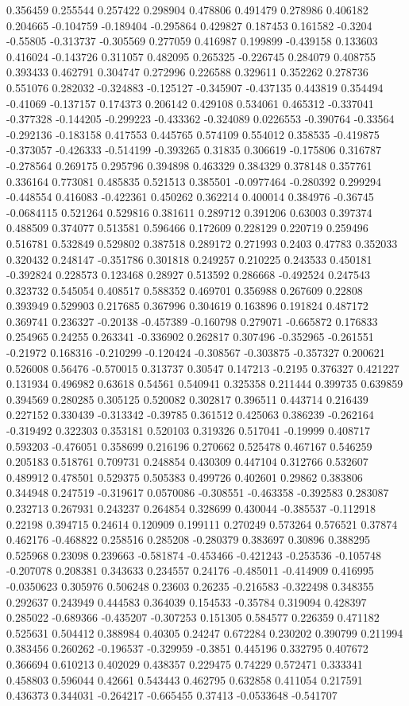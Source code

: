 0.356459 0.255544 0.257422 0.298904 0.478806 0.491479 0.278986 0.406182 0.204665 -0.104759 -0.189404 -0.295864 0.429827 0.187453 0.161582 -0.3204 -0.55805 -0.313737 -0.305569 0.277059 0.416987 0.199899 -0.439158 0.133603 0.416024 -0.143726 0.311057 0.482095 0.265325 -0.226745 0.284079 0.408755 0.393433 0.462791 0.304747 0.272996 0.226588 0.329611 0.352262 0.278736 0.551076 0.282032 -0.324883 -0.125127 -0.345907 -0.437135 0.443819 0.354494 -0.41069 -0.137157 0.174373 0.206142 0.429108 0.534061 0.465312 -0.337041 -0.377328 -0.144205 -0.299223 -0.433362 -0.324089 0.0226553 -0.390764 -0.33564 -0.292136 -0.183158 0.417553 0.445765 0.574109 0.554012 0.358535 -0.419875 -0.373057 -0.426333 -0.514199 -0.393265 0.31835 0.306619 -0.175806 0.316787 -0.278564 0.269175 0.295796 0.394898 0.463329 0.384329 0.378148 0.357761 0.336164 0.773081 0.485835 0.521513 0.385501 -0.0977464 -0.280392 0.299294 -0.448554 0.416083 -0.422361 0.450262 0.362214 0.400014 0.384976 -0.36745 -0.0684115 0.521264 0.529816 0.381611 0.289712 0.391206 0.63003 0.397374 0.488509 0.374077 0.513581 0.596466 0.172609 0.228129 0.220719 0.259496 0.516781 0.532849 0.529802 0.387518 0.289172 0.271993 0.2403 0.47783 0.352033 0.320432 0.248147 -0.351786 0.301818 0.249257 0.210225 0.243533 0.450181 -0.392824 0.228573 0.123468 0.28927 0.513592 0.286668 -0.492524 0.247543 0.323732 0.545054 0.408517 0.588352 0.469701 0.356988 0.267609 0.22808 0.393949 0.529903 0.217685 0.367996 0.304619 0.163896 0.191824 0.487172 0.369741 0.236327 -0.20138 -0.457389 -0.160798 0.279071 -0.665872 0.176833 0.254965 0.24255 0.263341 -0.336902 0.262817 0.307496 -0.352965 -0.261551 -0.21972 0.168316 -0.210299 -0.120424 -0.308567 -0.303875 -0.357327 0.200621 0.526008 0.56476 -0.570015 0.313737 0.30547 0.147213 -0.2195 0.376327 0.421227 0.131934 0.496982 0.63618 0.54561 0.540941 0.325358 0.211444 0.399735 0.639859 0.394569 0.280285 0.305125 0.520082 0.302817 0.396511 0.443714 0.216439 0.227152 0.330439 -0.313342 -0.39785 0.361512 0.425063 0.386239 -0.262164 -0.319492 0.322303 0.353181 0.520103 0.319326 0.517041 -0.19999 0.408717 0.593203 -0.476051 0.358699 0.216196 0.270662 0.525478 0.467167 0.546259 0.205183 0.518761 0.709731 0.248854 0.430309 0.447104 0.312766 0.532607 0.489912 0.478501 0.529375 0.505383 0.499726 0.402601 0.29862 0.383806 0.344948 0.247519 -0.319617 0.0570086 -0.308551 -0.463358 -0.392583 0.283087 0.232713 0.267931 0.243237 0.264854 0.328699 0.430044 -0.385537 -0.112918 0.22198 0.394715 0.24614 0.120909 0.199111 0.270249 0.573264 0.576521 0.37874 0.462176 -0.468822 0.258516 0.285208 -0.280379 0.383697 0.30896 0.388295 0.525968 0.23098 0.239663 -0.581874 -0.453466 -0.421243 -0.253536 -0.105748 -0.207078 0.208381 0.343633 0.234557 0.24176 -0.485011 -0.414909 0.416995 -0.0350623 0.305976 0.506248 0.23603 0.26235 -0.216583 -0.322498 0.348355 0.292637 0.243949 0.444583 0.364039 0.154533 -0.35784 0.319094 0.428397 0.285022 -0.689366 -0.435207 -0.307253 0.151305 0.584577 0.226359 0.471182 0.525631 0.504412 0.388984 0.40305 0.24247 0.672284 0.230202 0.390799 0.211994 0.383456 0.260262 -0.196537 -0.329959 -0.3851 0.445196 0.332795 0.407672 0.366694 0.610213 0.402029 0.438357 0.229475 0.74229 0.572471 0.333341 0.458803 0.596044 0.42661 0.543443 0.462795 0.632858 0.411054 0.217591 0.436373 0.344031 -0.264217 -0.665455 0.37413 -0.0533648 -0.541707 